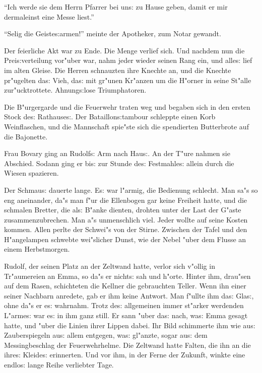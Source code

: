 \documentclass[oneside,12pt]{book}
\newcommand{\s}{s:}%
\begin{document}
"`Ich werde sie dem Herrn Pfarrer bei un{\s} zu Hause geben, damit
er mir dermaleinst eine Messe liest."'

"`Selig die Geiste{\s}armen!"' meinte der Apotheker, zum Notar
gewandt.

Der feierliche Akt war zu Ende. Die Menge verlief sich. Und
nachdem nun die Prei{\s}verteilung vor"uber war, nahm jeder wieder
seinen Rang ein, und alle{\s} lief im alten Gleise. Die Herren
schnauzten ihre Knechte an, und die Knechte pr"ugelten da{\s}
Vieh, da{\s} mit gr"unen Kr"anzen um die H"orner in seine St"alle
zur"ucktrottete. Ahnung{\s}lose Triumphatoren.

Die B"urgergarde und die Feuerwehr traten weg und begaben sich in
den ersten Stock de{\s} Rathause{\s}. Der Bataillon{\s}tambour
schleppte einen Korb Weinflaschen, und die Mannschaft spie"ste
sich die spendierten Butterbrote auf die Bajonette.

Frau Bovary ging an Rudolf{\s} Arm nach Hau{\s}. An der T"ure
nahmen sie Abschied. Sodann ging er bi{\s} zur Stunde de{\s}
Festmahle{\s} allein durch die Wiesen spazieren.

Der Schmau{\s} dauerte lange. E{\s} war l"armig, die Bedienung
schlecht. Man sa"s so eng aneinander, da"s man f"ur die Ellenbogen
gar keine Freiheit hatte, und die schmalen Bretter, die al{\s}
B"anke dienten, drohten unter der Last der G"aste zusammenzubrechen.
Man a"s unmenschlich viel. Jeder wollte auf seine Kosten kommen.
Allen perlte der Schwei"s von der Stirne. Zwischen der Tafel und
den H"angelampen schwebte wei"slicher Dunst, wie der Nebel "uber
dem Flusse an einem Herbstmorgen.

Rudolf, der seinen Platz an der Zeltwand hatte, verlor sich
v"ollig in Tr"aumereien an Emma, so da"s er nicht{\s} sah und
h"orte. Hinter ihm, drau"sen auf dem Rasen, schichteten die
Kellner die gebrauchten Teller. Wenn ihn einer seiner Nachbarn
anredete, gab er ihm keine Antwort. Man f"ullte ihm da{\s}
Gla{\s}, ohne da"s er e{\s} wahrnahm. Trotz de{\s} allgemeinen
immer st"arker werdenden L"arme{\s} war e{\s} in ihm ganz still.
Er sann "uber da{\s} nach, wa{\s} Emma gesagt hatte, und "uber die
Linien ihrer Lippen dabei. Ihr Bild schimmerte ihm wie au{\s}
Zauberspiegeln au{\s} allem entgegen, wa{\s} gl"anzte, sogar
au{\s} dem Messingbeschlag der Feuerwehrhelme. Die Zeltwand hatte
Falten, die ihn an die ihre{\s} Kleide{\s} erinnerten. Und vor
ihm, in der Ferne der Zukunft, winkte eine endlo{\s} lange Reihe
verliebter Tage.
\end{document}
